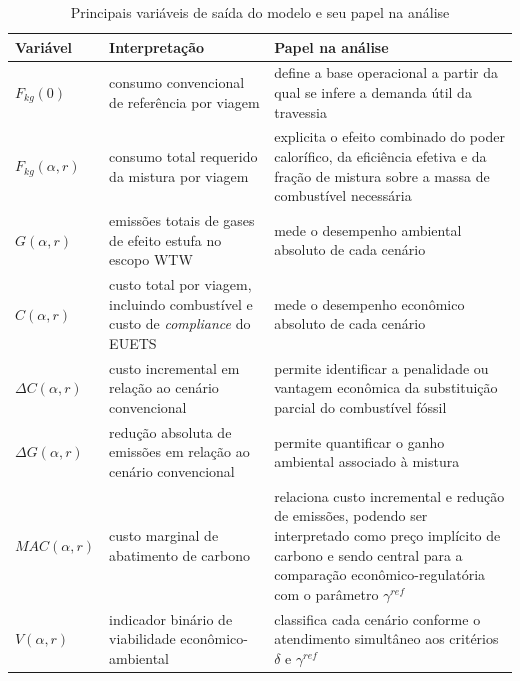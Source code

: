 \begin{table}[!ht]
\centering
\caption{Principais variáveis de saída do modelo e seu papel na análise}
\label{tab:variables_saida}
\small
\setlength{\tabcolsep}{5pt}
\begin{tabular}{lll}
\hline
\parbox[t]{2.6cm}{\textbf{Variável}} &
\parbox[t]{5.2cm}{\textbf{Interpretação}} &
\parbox[t]{6.0cm}{\textbf{Papel na análise}} \\
\hline
\parbox[t]{2.6cm}{$F_{kg}(0)$} &
\parbox[t]{5.2cm}{consumo convencional de referência por viagem} &
\parbox[t]{6.0cm}{define a base operacional a partir da qual se infere a demanda útil da travessia} \\
\parbox[t]{2.6cm}{$F_{kg}(\alpha,r)$} &
\parbox[t]{5.2cm}{consumo total requerido da mistura por viagem} &
\parbox[t]{6.0cm}{explicita o efeito combinado do poder calorífico, da eficiência efetiva e da fração de mistura sobre a massa de combustível necessária} \\
\parbox[t]{2.6cm}{$G(\alpha,r)$} &
\parbox[t]{5.2cm}{emissões totais de gases de efeito estufa no escopo \gls{WTW}} &
\parbox[t]{6.0cm}{mede o desempenho ambiental absoluto de cada cenário} \\
\parbox[t]{2.6cm}{$C(\alpha,r)$} &
\parbox[t]{5.2cm}{custo total por viagem, incluindo combustível e custo de \emph{compliance} do \gls{EUETS}} &
\parbox[t]{6.0cm}{mede o desempenho econômico absoluto de cada cenário} \\
\parbox[t]{2.6cm}{$\Delta C(\alpha,r)$} &
\parbox[t]{5.2cm}{custo incremental em relação ao cenário convencional} &
\parbox[t]{6.0cm}{permite identificar a penalidade ou vantagem econômica da substituição parcial do combustível fóssil} \\
\parbox[t]{2.6cm}{$\Delta G(\alpha,r)$} &
\parbox[t]{5.2cm}{redução absoluta de emissões em relação ao cenário convencional} &
\parbox[t]{6.0cm}{permite quantificar o ganho ambiental associado à mistura} \\
\parbox[t]{2.6cm}{$MAC(\alpha,r)$} &
\parbox[t]{5.2cm}{custo marginal de abatimento de carbono} &
\parbox[t]{6.0cm}{relaciona custo incremental e redução de emissões, podendo ser interpretado como preço implícito de carbono e sendo central para a comparação econômico-regulatória com o parâmetro $\gamma^{ref}$} \\
\parbox[t]{2.6cm}{$V(\alpha,r)$} &
\parbox[t]{5.2cm}{indicador binário de viabilidade econômico-ambiental} &
\parbox[t]{6.0cm}{classifica cada cenário conforme o atendimento simultâneo aos critérios $\delta$ e $\gamma^{ref}$} \\
\hline
\end{tabular}
\end{table}

